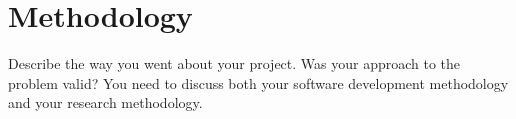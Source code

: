 \chapter{Methodology}
Describe the way you went about your project. Was your approach to the problem valid?
You need to discuss both your software development methodology and your research methodology.
